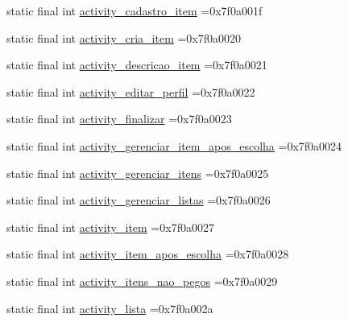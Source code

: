 \begin{DoxyCompactItemize}
\item 
static final int \mbox{\hyperlink{classbr_1_1unb_1_1cic_1_1mp_1_1marketmaster_1_1R_1_1layout_a17edabb0e32d2b5b9ae756349aef75ea}{activity\+\_\+cadastro\+\_\+item}} =0x7f0a001f
\item 
static final int \mbox{\hyperlink{classbr_1_1unb_1_1cic_1_1mp_1_1marketmaster_1_1R_1_1layout_a4c060b1fae02bdc8473c395dcf3323bc}{activity\+\_\+cria\+\_\+item}} =0x7f0a0020
\item 
static final int \mbox{\hyperlink{classbr_1_1unb_1_1cic_1_1mp_1_1marketmaster_1_1R_1_1layout_a79d9ca8e981a9d57b9c1a7f3db08a015}{activity\+\_\+descricao\+\_\+item}} =0x7f0a0021
\item 
static final int \mbox{\hyperlink{classbr_1_1unb_1_1cic_1_1mp_1_1marketmaster_1_1R_1_1layout_ae95db632337615c0de3e71bd365af592}{activity\+\_\+editar\+\_\+perfil}} =0x7f0a0022
\item 
static final int \mbox{\hyperlink{classbr_1_1unb_1_1cic_1_1mp_1_1marketmaster_1_1R_1_1layout_af9ba0ddfaa6ac51b36575ea44a4ec459}{activity\+\_\+finalizar}} =0x7f0a0023
\item 
static final int \mbox{\hyperlink{classbr_1_1unb_1_1cic_1_1mp_1_1marketmaster_1_1R_1_1layout_a124c86a7b93f8b563e1774dbead452f2}{activity\+\_\+gerenciar\+\_\+item\+\_\+apos\+\_\+escolha}} =0x7f0a0024
\item 
static final int \mbox{\hyperlink{classbr_1_1unb_1_1cic_1_1mp_1_1marketmaster_1_1R_1_1layout_ace9aa7798c535da9c7427a630fa4d95f}{activity\+\_\+gerenciar\+\_\+itens}} =0x7f0a0025
\item 
static final int \mbox{\hyperlink{classbr_1_1unb_1_1cic_1_1mp_1_1marketmaster_1_1R_1_1layout_a1b484fdfcd60158d74a3f2559f101bc8}{activity\+\_\+gerenciar\+\_\+listas}} =0x7f0a0026
\item 
static final int \mbox{\hyperlink{classbr_1_1unb_1_1cic_1_1mp_1_1marketmaster_1_1R_1_1layout_a74e11497b0c4b75352a0154bdca231f3}{activity\+\_\+item}} =0x7f0a0027
\item 
static final int \mbox{\hyperlink{classbr_1_1unb_1_1cic_1_1mp_1_1marketmaster_1_1R_1_1layout_a85354d2146cf7fd91015ec68fa982b5c}{activity\+\_\+item\+\_\+apos\+\_\+escolha}} =0x7f0a0028
\item 
static final int \mbox{\hyperlink{classbr_1_1unb_1_1cic_1_1mp_1_1marketmaster_1_1R_1_1layout_a8304cd11fe2c8d1907db7a12f016fb93}{activity\+\_\+itens\+\_\+nao\+\_\+pegos}} =0x7f0a0029
\item 
static final int \mbox{\hyperlink{classbr_1_1unb_1_1cic_1_1mp_1_1marketmaster_1_1R_1_1layout_ad8f1e1de57755128f07490bf0442ade4}{activity\+\_\+lista}} =0x7f0a002a

\end{DoxyCompactItemize}
